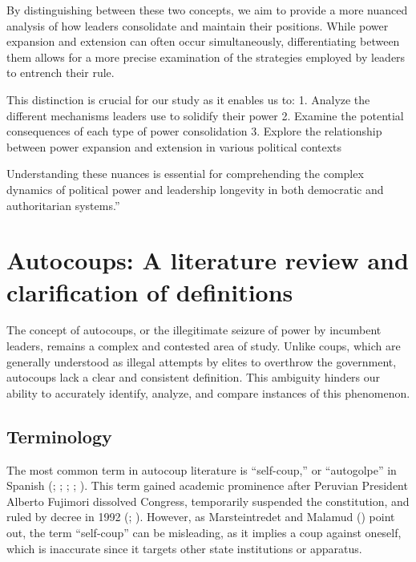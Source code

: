 \documentclass[
  12pt,
]{report}
\begin{document}
By distinguishing between these two concepts, we aim to provide a more
nuanced analysis of how leaders consolidate and maintain their
positions. While power expansion and extension can often occur
simultaneously, differentiating between them allows for a more precise
examination of the strategies employed by leaders to entrench their
rule.

This distinction is crucial for our study as it enables us to: 1.
Analyze the different mechanisms leaders use to solidify their power 2.
Examine the potential consequences of each type of power consolidation
3. Explore the relationship between power expansion and extension in
various political contexts

Understanding these nuances is essential for comprehending the complex
dynamics of political power and leadership longevity in both democratic
and authoritarian systems.''

\section{Autocoups: A literature review and clarification of
definitions}\label{autocoups-a-literature-review-and-clarification-of-definitions}

The concept of autocoups, or the illegitimate seizure of power by
incumbent leaders, remains a complex and contested area of study. Unlike
coups, which are generally understood as illegal attempts by elites to
overthrow the government, autocoups lack a clear and consistent
definition. This ambiguity hinders our ability to accurately identify,
analyze, and compare instances of this phenomenon.

\subsection{Terminology}\label{terminology}

The most common term in autocoup literature is ``self-coup,'' or
``autogolpe'' in Spanish (; ;
; ; ). This term gained academic prominence after Peruvian President
Alberto Fujimori dissolved Congress, temporarily suspended the
constitution, and ruled by decree in 1992
(;
). However, as
Marsteintredet and Malamud ()
point out, the term ``self-coup'' can be misleading, as it implies a
coup against oneself, which is inaccurate since it targets other state
institutions or apparatus.
\end{document}
